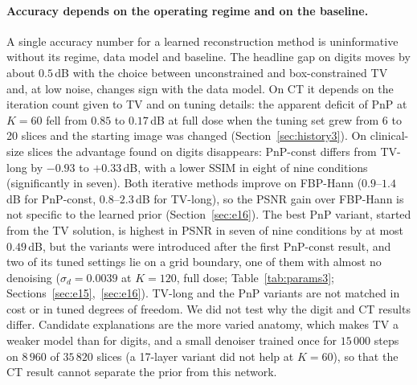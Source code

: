 \paragraph{Accuracy depends on the operating regime and on the baseline.}
A single accuracy number for a learned reconstruction method is uninformative without its regime, data model and baseline. The headline gap on digits moves by about $0.5$\,dB with the choice between unconstrained and box-constrained TV and, at low noise, changes sign with the data model. On CT it depends on the iteration count given to TV and on tuning details: the apparent deficit of PnP at $K=60$ fell from $0.85$ to $0.17$\,dB at full dose when the tuning set grew from 6 to 20 slices and the starting image was changed (Section~\ref{sec:history3}).
On clinical-size slices the advantage found on digits disappears: PnP-const differs from TV-long by $-0.93$ to $+0.33$\,dB, with a lower SSIM in eight of nine conditions (significantly in seven). Both iterative methods improve on FBP-Hann ($0.9$--$1.4$\,dB for PnP-const, $0.8$--$2.3$\,dB for TV-long), so the PSNR gain over FBP-Hann is not specific to the learned prior (Section~\ref{sec:e16}). The best PnP variant, started from the TV solution, is highest in PSNR in seven of nine conditions by at most $0.49$\,dB, but the variants were introduced after the first PnP-const result, and two of its tuned settings lie on a grid boundary, one of them with almost no denoising ($\sigma_d=0.0039$ at $K=120$, full dose; Table~\ref{tab:params3}; Sections~\ref{sec:e15},~\ref{sec:e16}). TV-long and the PnP variants are not matched in cost or in tuned degrees of freedom.
We did not test why the digit and CT results differ. Candidate explanations are the more varied anatomy, which makes TV a weaker model than for digits, and a small denoiser trained once for $15\,000$ steps on $8\,960$ of $35\,820$ slices (a 17-layer variant did not help at $K=60$), so that the CT result cannot separate the prior from this network.

